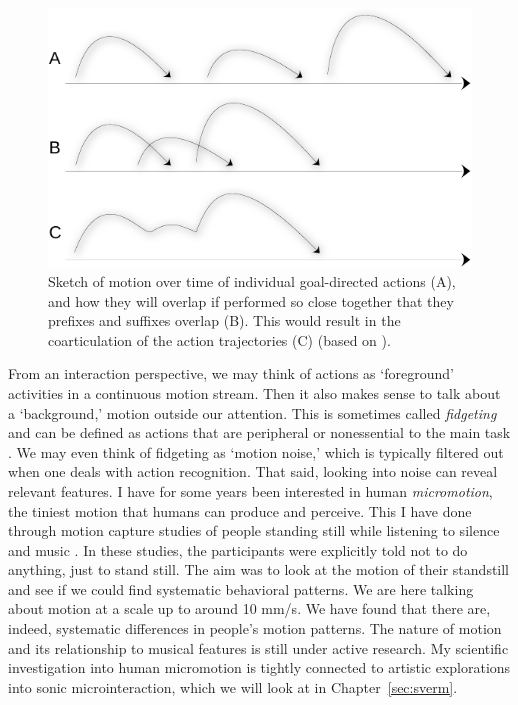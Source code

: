 \begin{figure}[tbp]
	\centerline{
	\includegraphics[width=.7\textwidth]{figures/21-coarticulation-crop.pdf}}
	\caption{Sketch of motion over time of individual goal-directed actions (A), and how they will overlap if performed so close together that they prefixes and suffixes overlap (B). This would result in the coarticulation of the action trajectories (C) (based on \citep{aramaki_understanding_2014}).}
	\label{fig:coarticulation}
\end{figure}

From an interaction perspective, we may think of actions as `foreground' activities in a continuous motion stream. Then it also makes sense to talk about a `background,' motion outside our attention. This is sometimes called \emph{fidgeting} and can be defined as actions that are peripheral or nonessential to the main task \citep{mehrabian_analysis_1986}. We may even think of fidgeting as `motion noise,' which is typically filtered out when one deals with action recognition. That said, looking into noise can reveal relevant features. I have for some years been interested in human \emph{micromotion}, the tiniest motion that humans can produce and perceive. This I have done through motion capture studies of people standing still while listening to silence and music \citep{jensenius_exploring_2017,gonzalez_sanchez_correspondences_2018,gonzalez_sanchez_analysis_2019,zelechowska_headphones_2020}. In these studies, the participants were explicitly told not to do anything, just to stand still. The aim was to look at the motion of their standstill and see if we could find systematic behavioral patterns. We are here talking about motion at a scale up to around 10 mm/s. We have found that there are, indeed, systematic differences in people's motion patterns. The nature of motion and its relationship to musical features is still under active research. My scientific investigation into human micromotion is tightly connected to artistic explorations into sonic microinteraction, which we will look at in Chapter~\ref{sec:sverm}.

